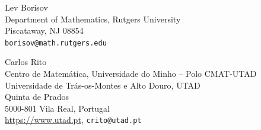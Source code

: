\documentclass[10pt,a4paper]{article}
\begin{document}





\vspace{1cm}

\noindent Lev Borisov \vspace{0.1cm} 
\\Department of Mathematics, Rutgers University
\\Piscataway, NJ 08854
\\ \verb|borisov@math.rutgers.edu| 

\vspace{1cm}

\noindent Carlos Rito
\vspace{0.1cm}
\\ Centro de Matem\'atica, Universidade do Minho -- Polo CMAT-UTAD
\vspace{0.1cm}
\\ Universidade de Tr\'as-os-Montes e Alto Douro, UTAD
\\ Quinta de Prados
\\ 5000-801 Vila Real, Portugal
\vspace{0.1cm}
\\ \url{https://www.utad.pt}, \texttt{crito@utad.pt}
\end{document}
